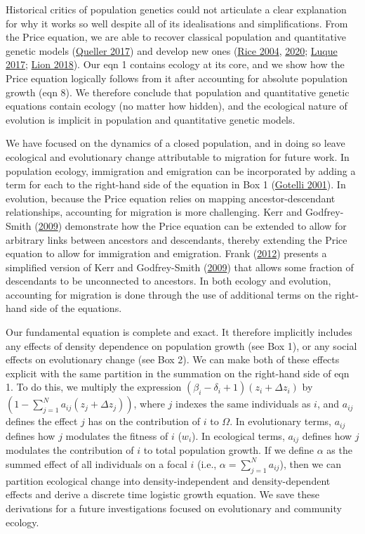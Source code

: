 \documentclass[
]{article}
\begin{document}
Historical critics of population genetics could not articulate a clear
explanation for why it works so well despite all of its idealisations
and simplifications. From the Price equation, we are able to recover
classical population and quantitative genetic models
(\protect\hyperlink{ref-Queller2017}{Queller 2017}) and develop new ones
(\protect\hyperlink{ref-Rice2004}{Rice 2004},
\protect\hyperlink{ref-Rice2020}{2020};
\protect\hyperlink{ref-Luque2016}{Luque 2017};
\protect\hyperlink{ref-Lion2018}{Lion 2018}). Our eqn 1 contains ecology
at its core, and we show how the Price equation logically follows from
it after accounting for absolute population growth (eqn 8). We therefore
conclude that population and quantitative genetic equations contain
ecology (no matter how hidden), and the ecological nature of evolution
is implicit in population and quantitative genetic models.

We have focused on the dynamics of a closed population, and in doing so
leave ecological and evolutionary change attributable to migration for
future work. In population ecology, immigration and emigration can be
incorporated by adding a term for each to the right-hand side of the
equation in Box 1 (\protect\hyperlink{ref-Gotelli2001}{Gotelli 2001}).
In evolution, because the Price equation relies on mapping
ancestor-descendant relationships, accounting for migration is more
challenging. Kerr and Godfrey-Smith
(\protect\hyperlink{ref-Kerr2009}{2009}) demonstrate how the Price
equation can be extended to allow for arbitrary links between ancestors
and descendants, thereby extending the Price equation to allow for
immigration and emigration. Frank
(\protect\hyperlink{ref-Frank2012}{2012}) presents a simplified version
of Kerr and Godfrey-Smith (\protect\hyperlink{ref-Kerr2009}{2009}) that
allows some fraction of descendants to be unconnected to ancestors. In
both ecology and evolution, accounting for migration is done through the
use of additional terms on the right-hand side of the equations.

Our fundamental equation is complete and exact. It therefore implicitly
includes any effects of density dependence on population growth (see Box
1), or any social effects on evolutionary change (see Box 2). We can
make both of these effects explicit with the same partition in the
summation on the right-hand side of eqn 1. To do this, we multiply the
expression
\(\left(\beta_{i} - \delta_{i} + 1 \right)\left(z_{i} + \Delta z_{i} \right)\)
by
\(\left(1 - \sum_{j=1}^{N} a_{ij}\left(z_{j} + \Delta z_{j}\right)\right)\),
where \(j\) indexes the same individuals as \(i\), and \(a_{ij}\)
defines the effect \(j\) has on the contribution of \(i\) to \(\Omega\).
In evolutionary terms, \(a_{ij}\) defines how \(j\) modulates the
fitness of \(i\) (\(w_{i}\)). In ecological terms, \(a_{ij}\) defines
how \(j\) modulates the contribution of \(i\) to total population
growth. If we define \(\alpha\) as the summed effect of all individuals
on a focal \(i\) (i.e., \(\alpha = \sum_{j=1}^{N} a_{ij}\)), then we can
partition ecological change into density-independent and
density-dependent effects and derive a discrete time logistic growth
equation. We save these derivations for a future investigations focused
on evolutionary and community ecology.
\end{document}
